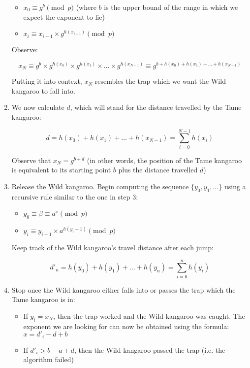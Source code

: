 \documentclass{article}
\begin{document}
\begin{enumerate}
            \begin{itemize}
              \item $x_0 \equiv g^b \pmod{p}$ (where $b$ is the upper bound of the range in which we expect the exponent to lie)
              \item $x_i \equiv x_{i-1} \times g^{h(x_{i-1})} \pmod{p}$
            \end{itemize}

            Observe:

            $$x_N \equiv g^b \times g^{ h(x_0) } \times g^{ h(x_1) } \times \ldots \times g^{ h(x_{N-1}) } \equiv g^{ b + h(x_0) + h(x_1) + \ldots + h(x_{N-1}) }$$

            Putting it into context, $x_N$ resembles the trap which we want the Wild kangaroo to fall into.

          \item We now calculate $d$, which will stand for the distance travelled by the Tame kangaroo:

            $$d = h(x_0) + h(x_1) + \ldots + h(x_{N-1}) = \sum_{i=0}^{N-1} h(x_i)$$

            Observe that $x_N = g^{b+d}$ (in other words, the position of the Tame kangaroo is equivalent to its starting point $b$ plus the distance travelled $d$)

          \item Release the Wild kangaroo. Begin computing the sequence $\{y_0, y_1, \ldots \}$ using a recursive rule similar to the one in step 3:
            \begin{itemize}
              \item $y_0 \equiv \beta \equiv a^x \pmod{p}$
              \item $y_i \equiv y_{i-1} \times a^{h(y_i-1)} \pmod{p}$
            \end{itemize}
            Keep track of the Wild kangaroo's travel distance after each jump:

            $$d'_n = h(y_0) + h(y_1) + \ldots + h(y_n) = \sum_{i=0}^{n} h(y_i)$$

          \item Stop once the Wild kangaroo either falls into or passes the trap which the Tame kangaroo is in:
            \begin{itemize}
              \item If $y_i = x_N$, then the trap worked and the Wild kangaroo was caught. The exponent we are looking for can now be obtained using the formula: $x = d'_i - d + b$

              \item If $d'_i > b - a + d$, then the Wild kangaroo passed the trap (i.e. the algorithm failed)
            \end{itemize}
        \end{enumerate}
\end{document}
